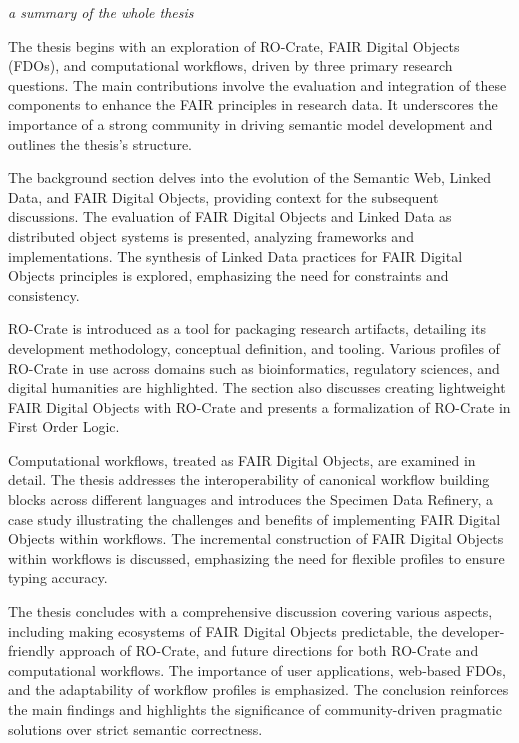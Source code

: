 \emph{a summary of the whole thesis}


The thesis begins with an exploration of RO-Crate, FAIR Digital Objects (FDOs), and computational workflows, driven by three primary research questions. The main contributions involve the evaluation and integration of these components to enhance the FAIR principles in research data. It underscores the importance of a strong community in driving semantic model development and outlines the thesis's structure.

The background section delves into the evolution of the Semantic Web, Linked Data, and FAIR Digital Objects, providing context for the subsequent discussions. The evaluation of FAIR Digital Objects and Linked Data as distributed object systems is presented, analyzing frameworks and implementations. The synthesis of Linked Data practices for FAIR Digital Objects principles is explored, emphasizing the need for constraints and consistency.

RO-Crate is introduced as a tool for packaging research artifacts, detailing its development methodology, conceptual definition, and tooling. Various profiles of RO-Crate in use across domains such as bioinformatics, regulatory sciences, and digital humanities are highlighted. The section also discusses creating lightweight FAIR Digital Objects with RO-Crate and presents a formalization of RO-Crate in First Order Logic.

Computational workflows, treated as FAIR Digital Objects, are examined in detail. The thesis addresses the interoperability of canonical workflow building blocks across different languages and introduces the Specimen Data Refinery, a case study illustrating the challenges and benefits of implementing FAIR Digital Objects within workflows. The incremental construction of FAIR Digital Objects within workflows is discussed, emphasizing the need for flexible profiles to ensure typing accuracy.

The thesis concludes with a comprehensive discussion covering various aspects, including making ecosystems of FAIR Digital Objects predictable, the developer-friendly approach of RO-Crate, and future directions for both RO-Crate and computational workflows. The importance of user applications, web-based FDOs, and the adaptability of workflow profiles is emphasized. The conclusion reinforces the main findings and highlights the significance of community-driven pragmatic solutions over strict semantic correctness.

